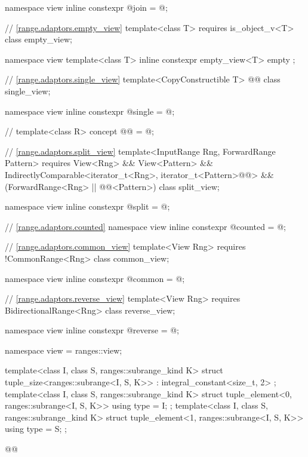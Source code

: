 {\begin{codeblock}
{{    namespace view { inline constexpr @\unspec@ join = @\unspecnc@; }

    // \ref{range.adaptors.empty_view}
    template<class T>
      requires is_object_v<T>
    class empty_view;

    namespace view {
      template<class T>
      inline constexpr empty_view<T> empty {};
    }

    // \ref{range.adaptors.single_view}
    template<CopyConstructible T>
      @@
    class single_view;

    namespace view { inline constexpr @\unspec@ single = @\unspecnc@; }

    // \expos
    template<class R>
    concept @@ = @\seebelownc@;

    // \ref{range.adaptors.split_view}
    template<InputRange Rng, ForwardRange Pattern>
      requires View<Rng> && View<Pattern> &&
          IndirectlyComparable<iterator_t<Rng>, iterator_t<Pattern>@@> &&
          (ForwardRange<Rng> || @@<Pattern>)
    class split_view;

    namespace view { inline constexpr @\unspec@ split = @\unspecnc@; }

    // \ref{range.adaptors.counted}
    namespace view { inline constexpr @\unspec@ counted = @\unspecnc@; }

    // \ref{range.adaptors.common_view}
    template<View Rng>
      requires !CommonRange<Rng>
    class common_view;

    namespace view { inline constexpr @\unspec@ common = @\unspecnc@; }

    // \ref{range.adaptors.reverse_view}
    template<View Rng>
      requires BidirectionalRange<Rng>
    class reverse_view;

    namespace view { inline constexpr @\unspec@ reverse = @\unspecnc@; }
  }

  namespace view = ranges::view;

  template<class I, class S, ranges::subrange_kind K>
    struct tuple_size<ranges::subrange<I, S, K>>
      : integral_constant<size_t, 2> {};
  template<class I, class S, ranges::subrange_kind K>
    struct tuple_element<0, ranges::subrange<I, S, K>> {
      using type = I;
    };
  template<class I, class S, ranges::subrange_kind K>
    struct tuple_element<1, ranges::subrange<I, S, K>> {
      using type = S;
    };
}@\oldtxt{\}\}}@
\end{codeblock}

}
